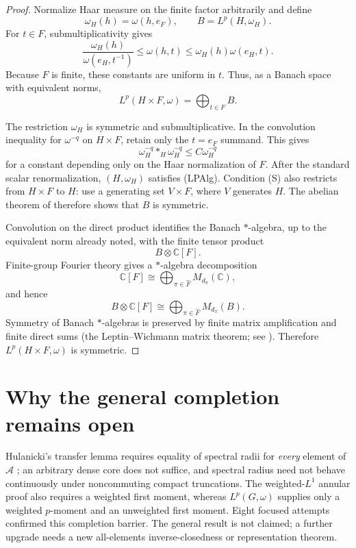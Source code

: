 \documentclass[11pt]{article}
\newcommand{\C}{\mathbb C}
\newcommand{\A}{\mathcal A}
\begin{document}
\begin{proof}
Normalize Haar measure on the finite factor arbitrarily and define
\[
 \omega_H(h)=\omega(h,e_F),\qquad B=L^p(H,\omega_H).
\]
For $t\in F$, submultiplicativity gives
\[
 \frac{\omega_H(h)}{\omega(e_H,t^{-1})}
 \leq \omega(h,t)
 \leq \omega_H(h)\omega(e_H,t).
\]
Because $F$ is finite, these constants are uniform in $t$.  Thus, as a
Banach space with equivalent norms,
\[
 L^p(H\times F,\omega)=\bigoplus_{t\in F} B.
\]

The restriction $\omega_H$ is symmetric and submultiplicative.  In the
convolution inequality for $\omega^{-q}$ on $H\times F$, retain only the
$t=e_F$ summand.  This gives
\[
 \omega_H^{-q}*_H\omega_H^{-q}\leq C\omega_H^{-q}
\]
for a constant depending only on the Haar normalization of $F$.  After the
standard scalar renormalization, $(H,\omega_H)$ satisfies (LPAlg).
Condition (S) also restricts from $H\times F$ to $H$: use a generating set
$V\times F$, where $V$ generates $H$.  The abelian theorem of
\cite{KuznetsovaMolitor} therefore shows that $B$ is symmetric.

Convolution on the direct product identifies the Banach $*$-algebra, up to
the equivalent norm already noted, with the finite tensor product
\[
 B\otimes\C[F].
\]
Finite-group Fourier theory gives a $*$-algebra decomposition
\[
 \C[F]\cong\bigoplus_{\pi\in\widehat F}M_{d_\pi}(\C),
\]
and hence
\[
 B\otimes\C[F]
 \cong\bigoplus_{\pi\in\widehat F}M_{d_\pi}(B).
\]
Symmetry of Banach $*$-algebras is preserved by finite matrix amplification
and finite direct sums (the Leptin--Wichmann matrix theorem; see
\cite{Palmer}).  Therefore $L^p(H\times F,\omega)$ is symmetric.
\end{proof}

\section{Why the general completion remains open}

Hulanicki's transfer lemma requires equality of spectral radii for
\emph{every} element of $\A$ \cite[Lemma~3.1]{FGL}; an arbitrary dense core
does not suffice, and spectral radius need not behave continuously under
noncommuting compact truncations.  The weighted-$L^1$ annular proof also
requires a weighted first moment, whereas $L^p(G,\omega)$ supplies only a
weighted $p$-moment and an unweighted first moment.  Eight focused attempts
confirmed this completion barrier.  The general result is not claimed; a
further upgrade needs a new all-elements inverse-closedness or representation
theorem.
\end{document}

